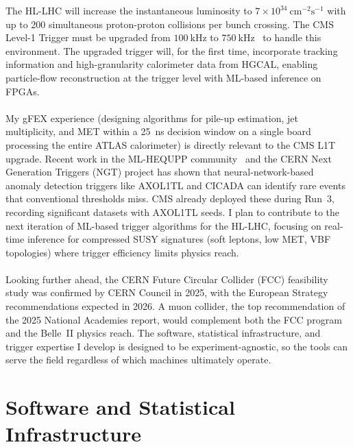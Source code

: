 \documentclass[10pt,a4paper,sans]{moderncv} %
\begin{document}
The HL-LHC will increase the instantaneous luminosity to $7 \times 10^{34}\ \mathrm{cm}^{-2}\mathrm{s}^{-1}$ with up to 200 simultaneous proton-proton collisions per bunch crossing. The CMS Level-1 Trigger must be upgraded from $100\ \mathrm{kHz}$ to $750\ \mathrm{kHz}$~\cite{cmstrigger} to handle this environment. The upgraded trigger will, for the first time, incorporate tracking information and high-granularity calorimeter data from HGCAL, enabling particle-flow reconstruction at the trigger level with ML-based inference on FPGAs.
\\
\\
My gFEX experience (designing algorithms for pile-up estimation, jet multiplicity, and MET within a 25~ns decision window on a single board processing the entire ATLAS calorimeter) is directly relevant to the CMS L1T upgrade. Recent work in the ML-HEQUPP community~\cite{Gonski:2026jgu} and the CERN Next Generation Triggers (NGT) project has shown that neural-network-based anomaly detection triggers like AXOL1TL and CICADA can identify rare events that conventional thresholds miss. CMS already deployed these during Run~3, recording significant datasets with AXOL1TL seeds. I plan to contribute to the next iteration of ML-based trigger algorithms for the HL-LHC, focusing on real-time inference for compressed SUSY signatures (soft leptons, low MET, VBF topologies) where trigger efficiency limits physics reach.
\\
\\
Looking further ahead, the CERN Future Circular Collider (FCC) feasibility study was confirmed by CERN Council in 2025, with the European Strategy recommendations expected in 2026. A muon collider, the top recommendation of the 2025 National Academies report, would complement both the FCC program and the Belle~II physics reach. The software, statistical infrastructure, and trigger expertise I develop is designed to be experiment-agnostic, so the tools can serve the field regardless of which machines ultimately operate.

\section{Software and Statistical Infrastructure}
\end{document}
